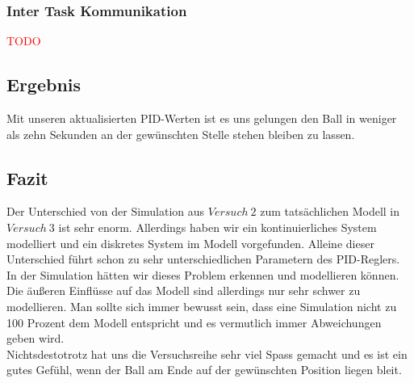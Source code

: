 \subsubsection{Inter Task Kommunikation}
\textcolor{red}{TODO}

\subsection{Ergebnis}
Mit unseren aktualisierten PID-Werten ist es uns gelungen den Ball in weniger als zehn Sekunden an der gewünschten Stelle stehen bleiben zu lassen.\\

\subsection{Fazit}
Der Unterschied von der Simulation aus $Versuch\ 2$ zum tatsächlichen Modell in $Versuch\ 3$ ist sehr enorm. Allerdings haben wir ein kontinuierliches System modelliert und ein diskretes System im Modell vorgefunden. Alleine dieser Unterschied führt schon zu sehr unterschiedlichen Parametern des PID-Reglers. In der Simulation hätten wir dieses Problem erkennen und modellieren können. \\
Die äußeren Einflüsse auf das Modell sind allerdings nur sehr schwer zu modellieren. Man sollte sich immer bewusst sein, dass eine Simulation nicht zu 100 Prozent dem Modell entspricht und es vermutlich immer Abweichungen geben wird. \\
Nichtsdestotrotz hat uns die Versuchsreihe sehr viel Spass gemacht und es ist ein gutes Gefühl, wenn der Ball am Ende auf der gewünschten Position liegen bleit.